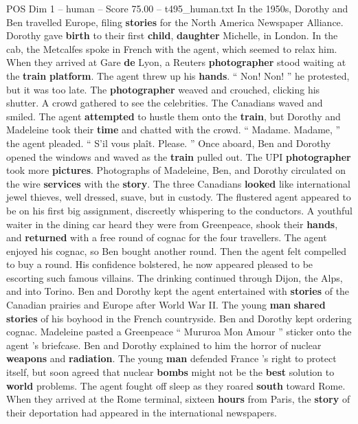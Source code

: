\begin{textsample}{POS Dim 1 – human – Score 75.00 – t495\_human.txt}
In the 1950s, Dorothy and Ben travelled Europe, filing \textbf{stories} for the North America Newspaper Alliance.
Dorothy gave \textbf{birth} to their first \textbf{child}, \textbf{daughter} Michelle, in London.
In the cab, the Metcalfes spoke in French with the agent, which seemed to relax him.
When they arrived at Gare \textbf{de} Lyon, a Reuters \textbf{photographer} stood waiting at the \textbf{train} \textbf{platform}.
The agent threw up his \textbf{hands}. “ Non!
Non! ” he protested, but it was too late.
The \textbf{photographer} weaved and crouched, clicking his shutter.
A crowd gathered to see the celebrities.
The Canadians waved and smiled.
The agent \textbf{attempted} to hustle them onto the \textbf{train}, but Dorothy and Madeleine took their \textbf{time} and chatted with the crowd. “ Madame.
Madame, ” the agent pleaded. “ S’il vous plaît.
Please. ” Once aboard, Ben and Dorothy opened the windows and waved as the \textbf{train} pulled out.
The UPI \textbf{photographer} took more \textbf{pictures}.
Photographs of Madeleine, Ben, and Dorothy circulated on the wire \textbf{services} with the \textbf{story}.
The three Canadians \textbf{looked} like international jewel thieves, well dressed, suave, but in custody.
The flustered agent appeared to be on his first big assignment, discreetly whispering to the conductors.
A youthful waiter in the dining car heard they were from Greenpeace, shook their \textbf{hands}, and \textbf{returned} with a free round of cognac for the four travellers.
The agent enjoyed his cognac, so Ben bought another round.
Then the agent felt compelled to buy a round.
His confidence bolstered, he now appeared pleased to be escorting such famous villains.
The drinking continued through Dijon, the Alps, and into Torino.
Ben and Dorothy kept the agent entertained with \textbf{stories} of the Canadian prairies and Europe after World War II.
The young \textbf{man} \textbf{shared} \textbf{stories} of his boyhood in the French countryside.
Ben and Dorothy kept ordering cognac.
Madeleine pasted a Greenpeace “ Mururoa Mon Amour ” sticker onto the agent ’s briefcase.
Ben and Dorothy explained to him the horror of nuclear \textbf{weapons} and \textbf{radiation}.
The young \textbf{man} defended France ’s right to protect itself, but soon agreed that nuclear \textbf{bombs} might not be the \textbf{best} solution to \textbf{world} problems.
The agent fought off sleep as they roared \textbf{south} toward Rome.
When they arrived at the Rome terminal, sixteen \textbf{hours} from Paris, the \textbf{story} of their deportation had appeared in the international newspapers.

\end{textsample}
